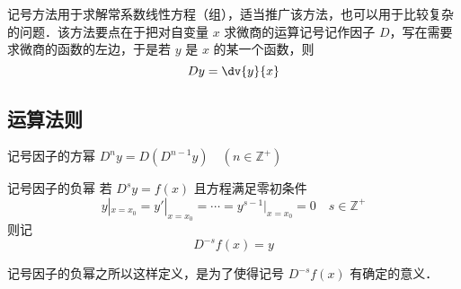 \begin{issues}
\issueDraft
\end{issues}

记号方法用于求解常系数线性方程（组），适当推广该方法，也可以用于比较复杂的问题．该方法要点在于把对自变量 $x$ 求微商的运算记号记作因子 $D$，写在需要求微商的函数的左边，于是若 $y$ 是 $x$ 的某一个函数，则
\begin{equation}
Dy=\dv{y}{x}
\end{equation}
\subsection{运算法则}
\begin{definition}{记号因子的方幂}\label{Sign_def1}
$D^ny=D(D^{n-1}y)\quad(n\in\mathbb{Z^{+}})$
\end{definition}
\begin{definition}{记号因子的负幂}\label{Sign_def2}
若 $D^sy=f(x)$ 且方程满足零初条件
\begin{equation}
y|_{x=x_0}=y'|_{x=x_0}=\cdots=y^{s-1}|_{x=x_0}=0\quad{s\in\mathbb{Z^{+}}}
\end{equation}
则记
\begin{equation}
D^{-s}f(x)=y
\end{equation}
\end{definition}
记号因子的负幂之所以这样定义，是为了使得记号 $D^{-s}f(x)$ 有确定的意义．


